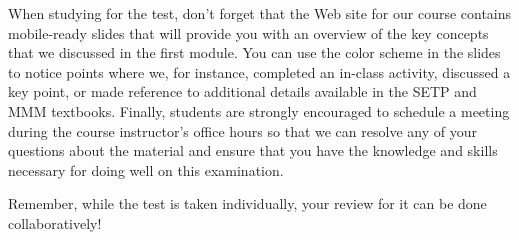 When studying for the test, don't forget that the Web site for our course contains mobile-ready slides that will provide
you with an overview of the key concepts that we discussed in the first module. You can use the color scheme in the
slides to notice points where we, for instance, completed an in-class activity, discussed a key point, or made reference
to additional details available in the SETP and MMM textbooks. Finally, students are strongly encouraged to schedule a
meeting during the course instructor's office hours so that we can resolve any of your questions about the material and
ensure that you have the knowledge and skills necessary for doing well on this examination.

Remember, while the test is taken individually, your review for it can be done collaboratively!


